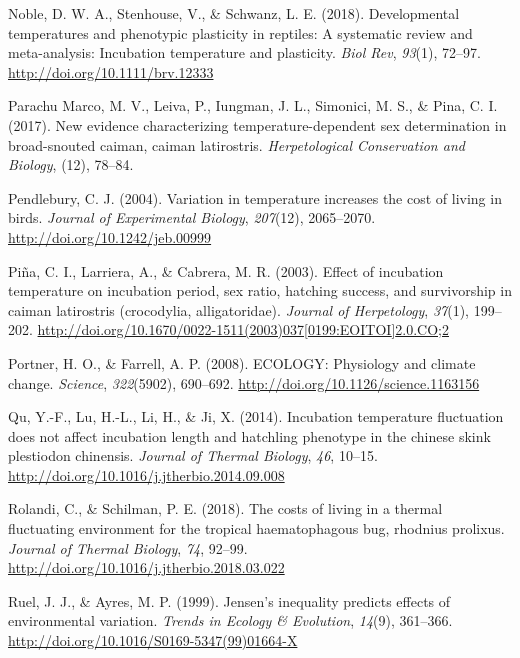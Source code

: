 \documentclass[12pt,twoside]{reedthesis}
\begin{document}
\leavevmode\hypertarget{ref-noble_developmental_2018}{}%
Noble, D. W. A., Stenhouse, V., \& Schwanz, L. E. (2018). Developmental temperatures and phenotypic plasticity in reptiles: A systematic review and meta-analysis: Incubation temperature and plasticity. \emph{Biol Rev}, \emph{93}(1), 72--97. \url{http://doi.org/10.1111/brv.12333}

\leavevmode\hypertarget{ref-parachu_marco_new_2017}{}%
Parachu Marco, M. V., Leiva, P., Iungman, J. L., Simonici, M. S., \& Pina, C. I. (2017). New evidence characterizing temperature-dependent sex determination in broad-snouted caiman, caiman latirostris. \emph{Herpetological Conservation and Biology}, (12), 78--84.

\leavevmode\hypertarget{ref-pendlebury_variation_2004-1}{}%
Pendlebury, C. J. (2004). Variation in temperature increases the cost of living in birds. \emph{Journal of Experimental Biology}, \emph{207}(12), 2065--2070. \url{http://doi.org/10.1242/jeb.00999}

\leavevmode\hypertarget{ref-pina_effect_2003}{}%
Piña, C. I., Larriera, A., \& Cabrera, M. R. (2003). Effect of incubation temperature on incubation period, sex ratio, hatching success, and survivorship in caiman latirostris (crocodylia, alligatoridae). \emph{Journal of Herpetology}, \emph{37}(1), 199--202. \href{http://doi.org/10.1670/0022-1511(2003)037\%5B0199:EOITOI\%5D2.0.CO;2}{http://doi.org/10.1670/0022-1511(2003)037{[}0199:EOITOI{]}2.0.CO;2}

\leavevmode\hypertarget{ref-portner_ecology_2008}{}%
Portner, H. O., \& Farrell, A. P. (2008). ECOLOGY: Physiology and climate change. \emph{Science}, \emph{322}(5902), 690--692. \url{http://doi.org/10.1126/science.1163156}

\leavevmode\hypertarget{ref-qu_incubation_2014}{}%
Qu, Y.-F., Lu, H.-L., Li, H., \& Ji, X. (2014). Incubation temperature fluctuation does not affect incubation length and hatchling phenotype in the chinese skink plestiodon chinensis. \emph{Journal of Thermal Biology}, \emph{46}, 10--15. \url{http://doi.org/10.1016/j.jtherbio.2014.09.008}

\leavevmode\hypertarget{ref-rolandi_costs_2018}{}%
Rolandi, C., \& Schilman, P. E. (2018). The costs of living in a thermal fluctuating environment for the tropical haematophagous bug, rhodnius prolixus. \emph{Journal of Thermal Biology}, \emph{74}, 92--99. \url{http://doi.org/10.1016/j.jtherbio.2018.03.022}

\leavevmode\hypertarget{ref-ruel_jensens_1999}{}%
Ruel, J. J., \& Ayres, M. P. (1999). Jensen's inequality predicts effects of environmental variation. \emph{Trends in Ecology \& Evolution}, \emph{14}(9), 361--366. \url{http://doi.org/10.1016/S0169-5347(99)01664-X}
\end{document}
